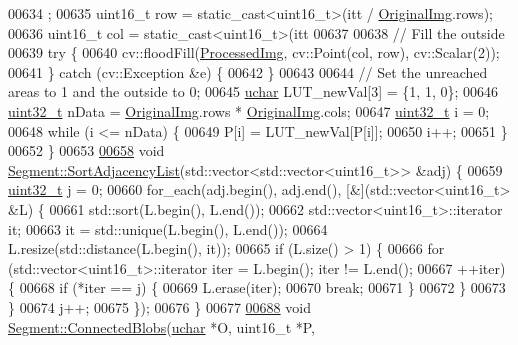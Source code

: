 \begin{DoxyCode}
00634     ;
00635   uint16\_t row = \textcolor{keyword}{static\_cast<}uint16\_t\textcolor{keyword}{>}(itt / \hyperlink{class_vision_1_1_image_processing_a77c370dab270158a4e9c634e2d3f48e7}{OriginalImg}.rows);
00636   uint16\_t col = \textcolor{keyword}{static\_cast<}uint16\_t\textcolor{keyword}{>}(itt %
00637 
00638   \textcolor{comment}{// Fill the outside}
00639   \textcolor{keywordflow}{try} \{
00640     cv::floodFill(\hyperlink{class_vision_1_1_image_processing_aa7d65742882cd1b2a1e4e9cb68809211}{ProcessedImg}, cv::Point(col, row), cv::Scalar(2));
00641   \} \textcolor{keywordflow}{catch} (cv::Exception &e) \{
00642   \}
00643 
00644   \textcolor{comment}{// Set the unreached areas to 1 and the outside to 0;}
00645   \hyperlink{_soil_math_types_8h_a65f85814a8290f9797005d3b28e7e5fc}{uchar} LUT\_newVal[3] = \{1, 1, 0\};
00646   \hyperlink{_soil_math_types_8h_a435d1572bf3f880d55459d9805097f62}{uint32\_t} nData = \hyperlink{class_vision_1_1_image_processing_a77c370dab270158a4e9c634e2d3f48e7}{OriginalImg}.rows * \hyperlink{class_vision_1_1_image_processing_a77c370dab270158a4e9c634e2d3f48e7}{OriginalImg}.cols;
00647   \hyperlink{_soil_math_types_8h_a435d1572bf3f880d55459d9805097f62}{uint32\_t} i = 0;
00648   \textcolor{keywordflow}{while} (i <= nData) \{
00649     P[i] = LUT\_newVal[P[i]];
00650     i++;
00651   \}
00652 \}
00653 
\hypertarget{_segment_8cpp_source_l00658}{}\hyperlink{class_vision_1_1_segment_a3d369e9d8b65dc96a3d4ac5ab8887960}{00658} \textcolor{keywordtype}{void} \hyperlink{class_vision_1_1_segment_a3d369e9d8b65dc96a3d4ac5ab8887960}{Segment::SortAdjacencyList}(std::vector<std::vector<uint16\_t>> &adj) \{
00659   \hyperlink{_soil_math_types_8h_a435d1572bf3f880d55459d9805097f62}{uint32\_t} j = 0;
00660   for\_each(adj.begin(), adj.end(), [&](std::vector<uint16\_t> &L) \{
00661     std::sort(L.begin(), L.end());
00662     std::vector<uint16\_t>::iterator it;
00663     it = std::unique(L.begin(), L.end());
00664     L.resize(std::distance(L.begin(), it));
00665     \textcolor{keywordflow}{if} (L.size() > 1) \{
00666       \textcolor{keywordflow}{for} (std::vector<uint16\_t>::iterator iter = L.begin(); iter != L.end();
00667            ++iter) \{
00668         \textcolor{keywordflow}{if} (*iter == j) \{
00669           L.erase(iter);
00670           \textcolor{keywordflow}{break};
00671         \}
00672       \}
00673     \}
00674     j++;
00675   \});
00676 \}
00677 
\hypertarget{_segment_8cpp_source_l00688}{}\hyperlink{class_vision_1_1_segment_a77bbb909901188d02a42c7df29186289}{00688} \textcolor{keywordtype}{void} \hyperlink{class_vision_1_1_segment_a77bbb909901188d02a42c7df29186289}{Segment::ConnectedBlobs}(\hyperlink{_soil_math_types_8h_a65f85814a8290f9797005d3b28e7e5fc}{uchar} *O, uint16\_t *P,

\end{DoxyCode}
